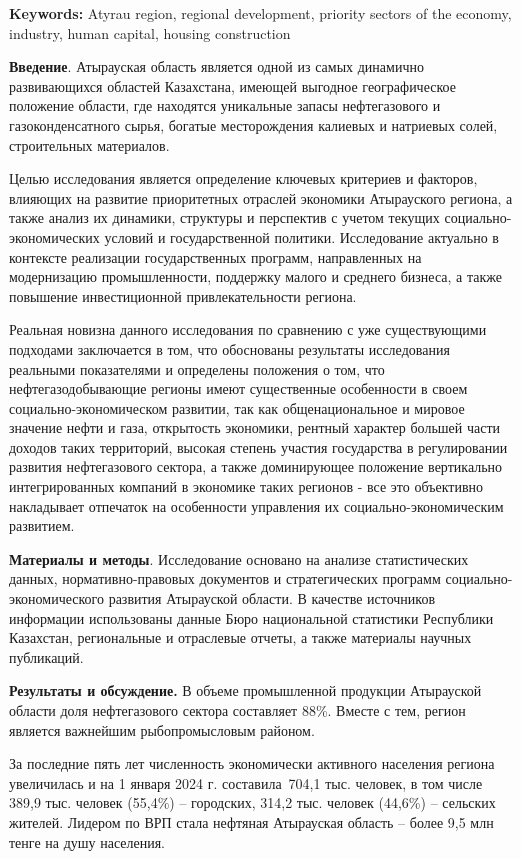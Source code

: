 {\bfseries Keywords:} Atyrau region, regional development, priority sectors
of the economy, industry, human capital, housing construction

\begin{multicols}{2}
{\bfseries Введение}. Атырауская область является одной из самых динамично
развивающихся областей Казахстана, имеющей выгодное географическое
положение области, где находятся уникальные запасы нефтегазового и
газоконденсатного сырья, богатые месторождения калиевых и натриевых
солей, строительных материалов.

Целью исследования является определение ключевых критериев и факторов,
влияющих на развитие приоритетных отраслей экономики Атырауского
региона, а также анализ их динамики, структуры и перспектив с учетом
текущих социально-экономических условий и государственной политики.
Исследование актуально в контексте реализации государственных программ,
направленных на модернизацию промышленности, поддержку малого и среднего
бизнеса, а также повышение инвестиционной привлекательности региона.

Реальная новизна данного исследования по сравнению с уже существующими
подходами заключается в том, что обоснованы результаты исследования
реальными показателями и определены положения о том, что
нефтегазодобывающие регионы имеют существенные особенности в своем
социально-экономическом развитии, так как общенациональное и мировое
значение нефти и газа, открытость экономики, рентный характер большей
части доходов таких территорий, высокая степень участия государства в
регулировании развития нефтегазового сектора, а также доминирующее
положение вертикально интегрированных компаний в экономике таких
регионов - все это объективно накладывает отпечаток на особенности
управления их социально-экономическим развитием.

{\bfseries Материалы и методы}. Исследование основано на анализе
статистических данных, нормативно-правовых документов и стратегических
программ социально-экономического развития Атырауской области. В
качестве источников информации использованы данные Бюро национальной
статистики Республики Казахстан, региональные и отраслевые отчеты, а
также материалы научных публикаций.

{\bfseries Результаты и обсуждение.} В объеме промышленной продукции
Атырауской области доля нефтегазового сектора составляет 88\%. Вместе с
тем, регион является важнейшим рыбопромысловым районом.

За последние пять лет чис­ленность экономически активного населения
региона увеличилась и на 1 января 2024 г. составила~704,1 тыс. человек,
в том числе 389,9 тыс. человек (55,4\%) -- городских, 314,2 тыс. человек
(44,6\%) -- сельских жителей. Лидером по ВРП стала нефтяная Атырауская
область -- более 9,5 млн тенге на душу населения.


\end{multicols}
